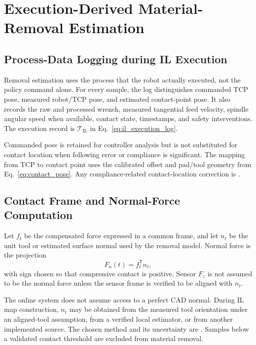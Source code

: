 \chapter{Execution-Derived Material-Removal Estimation}
\label{chap:removal_estimation}

\section{Process-Data Logging during IL Execution}
Removal estimation uses the process that the robot actually executed, not the policy command alone. For every sample, the log distinguishes commanded TCP pose, measured robot/TCP pose, and estimated contact-point pose. It also records the raw and processed wrench, measured tangential feed velocity, spindle angular speed when available, contact state, timestamps, and safety interventions. The execution record is \(\mathcal{T}_{\mathrm{IL}}\) in Eq.~\eqref{eq:il_execution_log}.

Commanded pose is retained for controller analysis but is not substituted for contact location when following error or compliance is significant. The mapping from TCP to contact point uses the calibrated offset and pad/tool geometry from Eq.~\eqref{eq:contact_pose}. Any compliance-related contact-location correction is .

\section{Contact Frame and Normal-Force Computation}
Let \(f_t\) be the compensated force expressed in a common frame, and let \(n_t\) be the unit tool or estimated surface normal used by the removal model. Normal force is the projection
\begin{equation}
  F_n(t)=f_t^\mathsf{T}n_t,
  \label{eq:normal_force_projection}
\end{equation}
with sign chosen so that compressive contact is positive. Sensor \(F_z\) is not assumed to be the normal force unless the sensor frame is verified to be aligned with \(n_t\).

The online system does not assume access to a perfect CAD normal. During IL map construction, \(n_t\) may be obtained from the measured tool orientation under an aligned-tool assumption, from a verified local estimator, or from another implemented source. The chosen method and its uncertainty are . Samples below a validated contact threshold are excluded from material removal.

